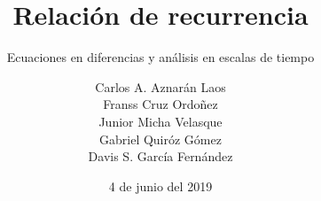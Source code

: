 \documentclass[graybox,envcountchap,sectrefs]{svmono}
\date{4 de junio del 2019}
\begin{document}
\author{
	Carlos A. Aznarán Laos\\
	Franss Cruz Ordoñez\\
	Junior Micha Velasque\\
	Gabriel Quiróz Gómez\\
	Davis S. García Fernández
}
\title{Relación de recurrencia}
\subtitle{Ecuaciones en diferencias y análisis en escalas de tiempo}
\maketitle

\frontmatter





\tableofcontents



\mainmatter

%






%


\backmatter


%
\printindex
\end{document}
